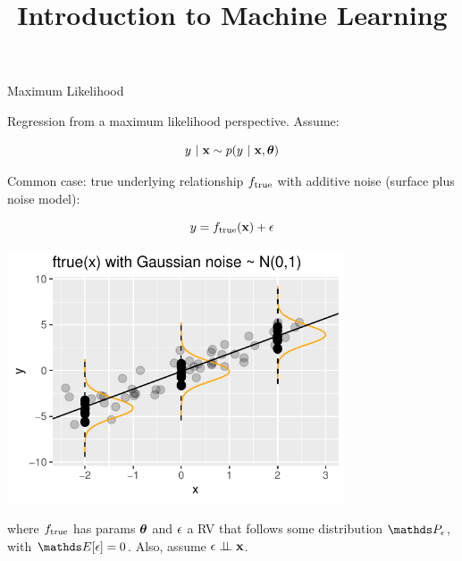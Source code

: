 \documentclass[11pt,compress,t,notes=noshow, xcolor=table]{beamer}
\title{Introduction to Machine Learning}
\begin{document}
    

\begin{vbframe}{Maximum Likelihood}

Regression from a maximum likelihood perspective. Assume: 

$$
	y~|~ \mathbf{x} \sim p(y~|~\mathbf{x}, \bm{\theta})
$$

\vspace{0.5cm}

Common case: 
true underlying relationship $f_{\text{true}}$ with additive noise (surface plus noise model): 

\vspace{0.5cm}

\begin{minipage}{0.5\textwidth}
$$
y = f_{\text{true}}(\mathbf{x}) + \epsilon
$$
\end{minipage}%
\begin{minipage}{0.5\textwidth}
\includegraphics[width = 0.75\textwidth]{figure/ftrue.pdf}
\end{minipage}

where $f_{\text{true}}$ has params $\bm{\theta}$ and $\epsilon$ a RV that follows some distribution $\P_\eps$, with $\E[\eps] = 0$. Also, assume $\epsilon \perp \!\!\! \perp \mathbf{x}$.



\end{vbframe}
\end{document}
